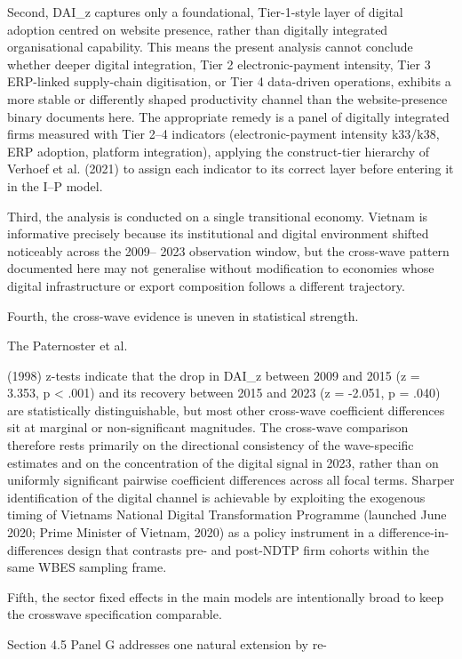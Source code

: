 \documentclass[12pt,a4paper]{article}
\begin{document}
Second, DAI\_z captures only a foundational, Tier-1-style layer of
digital adoption centred on website presence, rather than digitally
integrated organisational capability. This means the present analysis
cannot conclude whether deeper digital integration, Tier 2
electronic-payment intensity, Tier 3 ERP-linked supply-chain
digitisation, or Tier 4 data-driven operations, exhibits a more stable
or differently shaped productivity channel than the website-presence
binary documents here. The appropriate remedy is a panel of digitally
integrated firms measured with Tier 2--4 indicators (electronic-payment
intensity k33/k38, ERP adoption, platform integration), applying the
construct-tier hierarchy of Verhoef et al. (2021) to assign each
indicator to its correct layer before entering it in the I--P model.

Third, the analysis is conducted on a single transitional economy.
Vietnam is informative precisely because its institutional and digital
environment shifted noticeably across the 2009-- 2023 observation
window, but the cross-wave pattern documented here may not generalise
without modification to economies whose digital infrastructure or export
composition follows a different trajectory.

Fourth, the cross-wave evidence is uneven in statistical strength.

The Paternoster et al.

(1998) z-tests indicate that the drop in DAI\_z between 2009 and 2015 (z
= 3.353, p \textless{} .001) and its recovery between 2015 and 2023 (z =
-2.051, p = .040) are statistically distinguishable, but most other
cross-wave coefficient differences sit at marginal or non-significant
magnitudes. The cross-wave comparison therefore rests primarily on the
directional consistency of the wave-specific estimates and on the
concentration of the digital signal in 2023, rather than on uniformly
significant pairwise coefficient differences across all focal terms.
Sharper identification of the digital channel is achievable by
exploiting the exogenous timing of Vietnam\textquotesingle s National
Digital Transformation Programme (launched June 2020; Prime Minister of
Vietnam, 2020) as a policy instrument in a difference-in-differences
design that contrasts pre- and post-NDTP firm cohorts within the same
WBES sampling frame.

Fifth, the sector fixed effects in the main models are intentionally
broad to keep the crosswave specification comparable.

Section 4.5 Panel G addresses one natural extension by re-
\end{document}
